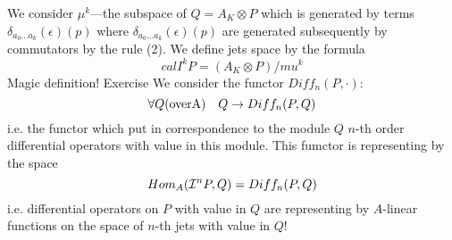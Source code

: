  We consider $\mu^k$---the subspace of $Q=A_K\otimes P$
which is generated by terms
 $\delta_{a_0\dots a_k}(\epsilon)(p)$
where $\delta_{a_0\dots a_k}(\epsilon)(p)$
are generated subsequently by commutators by the rule (2).
We define jets space by the formula
               $$
            {cal I}^k P=(A_K\otimes P)/mu^k
                    $$
 Magic definition!
     Exercise
We consider the functor $Diff_n(P,\cdot)$:
                    $$
         \forall Q ({\rm over A})\quad
             Q\rightarrow Diff_n(P,Q)
                   $$
i.e. the functor which put in correspondence to the module
 $Q$ $n$-th order differential operators with value in this module.
This fumctor is representing by the space
                   $$
                  Hom_A({\cal I}^n P,Q)=Diff_n(P,Q)
               $$
i.e. differential operators on $P$ with value in $Q$ are representing
by $A$-linear functions on the   space of $n$-th jets
 with value in $Q$!




  \bye
